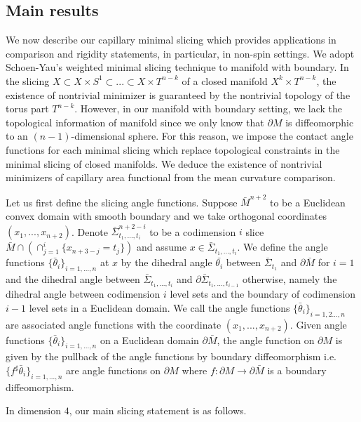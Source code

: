\documentclass[11pt,letterpaper]{amsart}
\begin{document}
\subsection{Main results}
We now describe our capillary minimal slicing which provides applications in comparison and rigidity statements, in particular, in non-spin settings. We adopt Schoen-Yau's weighted minimal slicing technique to manifold with boundary. In the slicing $X \subset X \times S^{1} \subset ... \subset X \times T^{n-k}$ of a closed manifold $X^{k} \times T^{n-k}$, the existence of nontrivial minimizer is guaranteed by the nontrivial topology of the torus part $T^{n-k}$. However, in our manifold with boundary setting, we lack the topological information of manifold since we only know that $\partial M$ is diffeomorphic to an $(n-1)$-dimensional sphere. For this reason, we impose the contact angle functions for each minimal slicing which replace topological constraints in the minimal slicing of closed manifolds. We deduce the existence of nontrivial minimizers of capillary area functional from the mean curvature comparison. 

Let us first define the slicing angle functions. Suppose $\bar{M}^{n+2}$ to be a Euclidean convex domain with smooth boundary and we take orthogonal coordinates $(x_{1}, ..., x_{n+2})$.  Denote $\bar{\Sigma}_{t_{1}, ..., t_{i}}^{n+2-i}$ to be a codimension $i$ slice $\bar{M} \cap( \cap_{j=1}^{i} \{ x_{n+3-j} = t_{j} \})$ and assume $x \in \bar{\Sigma}_{t_{1}, ..., t_{i}}$. We define the angle functions $\{\bar{\theta}_{i}\}_{i=1, ..., n}$ at $x$ by the dihedral angle $\bar{\theta_{i}}$ between $\bar{\Sigma}_{t_{1}}$ and $\partial \bar{M}$ for $i=1$ and the dihedral angle between $\bar{\Sigma}_{t_{1}, ..., t_{i}}$ and $\partial \bar{\Sigma}_{t_{1}, ..., t_{i-1}}$ otherwise, namely the dihedral angle between codimension $i$ level sets and the boundary of codimension $i-1$ level sets in a Euclidean domain. We call the angle functions $\{\bar{\theta}_{i}\}_{i=1,2 ..., n}$ are associated angle functions with the coordinate $(x_{1}, ..., x_{n+2})$. Given angle functions $\{\bar{\theta}_{i}\}_{i=1, ..., n}$ on a Euclidean domain $\partial \bar{M}$, the angle function on $\partial M$ is given by the pullback of the angle functions by boundary diffeomorphism i.e. $\{ f^{\sharp} \bar{\theta}_{i}\}_{i=1, ..., n}$ are angle functions on $\partial M$ where $f : \partial M \rightarrow \partial \bar{M}$ is a boundary diffeomorphism.

In dimension $4$, our main slicing statement is as follows. 
\end{document}

